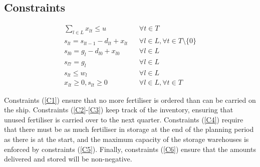 \documentclass{article}
\begin{document}
	\subsection*{Constraints}
	\begin{align}
		\sum_{l\in L} x_{lt} \leq u && \forall t\in T\label{C1}\\
		s_{lt} = s_{lt-1} - d_{lt} + x_{lt} && \forall l\in L, \forall t\in T\setminus \{0\}\label{C2}\\
		s_{l0} = g_l - d_{l0} + x_{l0} && \forall l\in L\label{C3}\\
		s_{l7} = g_l && \forall l \in L\label{C4}\\
		s_{lt} \leq w_l && \forall l \in L\label{C5}\\
		x_{lt}\geq 0, s_{lt}\geq 0 && \forall l \in L, \forall t\in T\label{C6}
	\end{align}
	
	Constraints (\ref{C1}) ensure that no more fertiliser is ordered than can be carried on the ship. Constraints (\ref{C2}-\ref{C3}) keep track of the inventory, ensuring that unused fertiliser is carried over to the next quarter. Constraints (\ref{C4}) require that there must be as much fertiliser in storage at the end of the planning period as there is at the start, and the maximum capacity of the storage warehouses is enforced by constraints (\ref{C5}). Finally, constraints (\ref{C6}) ensure that the amounts delivered and stored will be non-negative.
\end{document}
